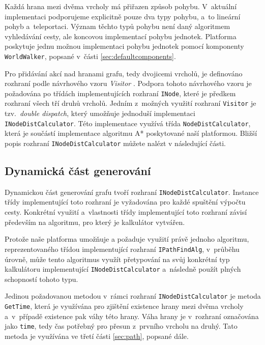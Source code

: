 Každá hrana mezi dvěma vrcholy má přiřazen způsob pohybu. V~aktuální implementaci podporujeme explicitně pouze dva typy pohybu, a~to lineární pohyb a~teleportaci. Význam těchto typů pohybu není daný algoritmem vyhledávání cesty, ale koncovou implementací pohybu jednotek. Platforma poskytuje jednu možnou implementaci pohybu jednotek pomocí komponenty \texttt{WorldWalker}, popsané v~části \ref{sec:defaultcomponents}.

Pro přidávání akcí nad hranami grafu, tedy dvojicemi vrcholů, je definováno rozhraní podle návrhového vzoru \textit{Visitor} \citep[str.~331]{book:gangoffour}. Podpora tohoto návrhového vzoru je požadována po třídách implementujících rozhraní \texttt{INode}, které je předkem rozhraní všech tří druhů vrcholů. Jedním z~možných využití rozhraní \texttt{Visitor} je tzv.~\textit{double dispatch}, který umožňuje jednoduší implementaci \texttt{INodeDistCalculator}. Této implementace využívá třída \texttt{NodeDistCalculator}, která je součástí implementace algoritmu A* poskytované naší platformou. Bližší popis rozhraní \texttt{INodeDistCalculator} můžete nalézt v následující části.

\subsection{Dynamická část generování}
Dynamickou část generování grafu tvoří rozhraní \texttt{INodeDistCalculator}. Instance třídy implementující toto rozhraní je vyžadována pro každé spuštění výpočtu cesty. Konkrétní využití a~vlastnosti třídy implementující toto rozhraní závisí především na algoritmu, pro který je kalkulátor vytvářen. 

Protože naše platforma umožňuje a požaduje využití právě jednoho algoritmu, reprezentovaného třídou implementující rozhraní 
\texttt{IPathFindAlg}, v~průběhu úrovně, může tento algoritmus využít přetypování na svůj konkrétní typ kalkulátoru implementující \texttt{INodeDistCalculator} a~následně použít plných schopností tohoto typu. 


Jedinou požadovanou metodou v~rámci rozhraní \texttt{INodeDistCalculator} je metoda \texttt{GetTime}, která je využívána pro zjištění existence hrany mezi dvěma vrcholy a~v~případě existence pak váhy této hrany. Váha hrany je v~rozhraní označována jako \texttt{time}, tedy čas potřebný pro přesun z~prvního vrcholu na druhý. Tato metoda je využívána ve třetí části \ref{sec:path}, popsané dále.

